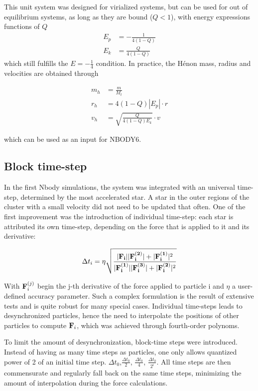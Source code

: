This unit system was designed for virialized systems, but can be used for out of equilibrium systems, as long as they are bound ($Q <1$), with energy expressions functions of $Q$
\begin{align}
E_p  &= - \frac{1}{4(1-Q)}\\
E_k &= \frac{Q}{4(1-Q)}
\end{align}
which still fulfills the $E = -\frac{1}{4}$ condition. In practice, the H\'enon mass, radius and velocities are obtained through

\begin{align}
m_h &= \frac{m}{M_t}\\
r_h &= 4 (1-Q) |E_p| \cdot r\\
v_h &= \sqrt{ \frac{Q}{4(1-Q) E_k} } \cdot v
\end{align}

which can be used as an input for NBODY6.
\subsection{Block time-step}
 
In the first Nbody simulations, the system was integrated with an universal time-step, determined by the most accelerated star. A star in the outer regions of the cluster with a small velocity did not need to be updated that often. One of the first improvement  was the introduction of individual time-step: each star is attributed its own time-step, depending on the force that is applied to it and its derivative:

\begin{equation}
\label{Eq:0_timestep}
\Delta t_i =  \eta \sqrt{\frac{ |\bold{F_i}||\bold{F^{(2)}_i}| + |\bold{F^{(1)}_i}|^2 }{|\bold{F^{(1)}_i}||\bold{F^{(3)}_i}| + |\bold{F^{(2)}_i}|^2}}
\end{equation}
 
With $\bold{F}^{(j)}_i$ begin the j-th derivative of the force applied to particle i and $\eta$ a user-defined accuracy parameter. Such a complex formulation is the result of extensive tests and is quite robust for many special cases. Individual time-steps leads to desynchronized particles, hence the need to interpolate the positions of other particles to compute $\bold{F}_i$, which was achieved through fourth-order polynoms.
 
 To limit the amount of desynchronization, block-time steps were introduced. Instead of having as many time steps as particles, one only allows quantized power of 2 of an initial time step. $\Delta t_0$,$\frac{\Delta t_0}{2}$, $\frac{\Delta t_0}{4}$, $\frac{\Delta t_0}{2^i}$. All time steps are then commensurate and regularly fall back on the same time steps, minimizing the amount of interpolation during the force calculations.
 
